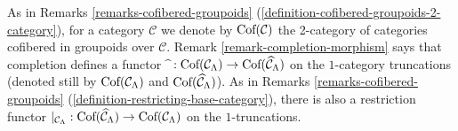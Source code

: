 \begin{remark}
\label{remark-completion-restriction-adjoint}
As in Remarks \ref{remarks-cofibered-groupoids} 
(\ref{definition-cofibered-groupoids-2-category}), for a category $\mathcal C$ 
we denote by $\textnormal{Cof}(\mathcal C)$ the 2-category of categories 
cofibered in groupoids over $\mathcal C$. Remark 
\ref{remark-completion-morphism} says that completion defines a functor 
$\widehat{~}: \textnormal{Cof}(\mathcal C_{\Lambda}) \rightarrow 
\textnormal{Cof}(\widehat{\mathcal C}_{\Lambda})$ on the $1$-category 
truncations (denoted still by $\textnormal{Cof}(\mathcal C_{\Lambda})$ and 
$\textnormal{Cof}(\widehat{\mathcal C}_{\Lambda})$).  As in Remarks 
\ref{remarks-cofibered-groupoids} (\ref{definition-restricting-base-category}), 
there is also a restriction functor $|_{\mathcal C_{\Lambda}}: 
\textnormal{Cof}(\widehat{\mathcal C}_{\Lambda}) \rightarrow 
\textnormal{Cof}(\mathcal C_{\Lambda})$ on the $1$-truncations.  


\end{remark}
